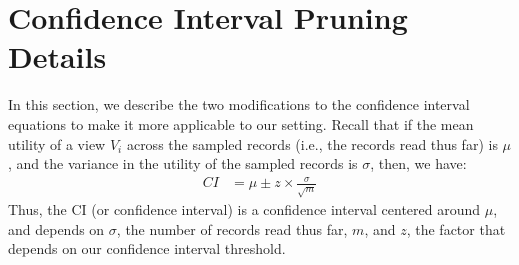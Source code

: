 
\section{Confidence Interval Pruning Details}
In this section, we describe the two modifications to 
the confidence interval equations to make it more applicable to our setting.
Recall that if the mean utility of a view $V_i$ across the sampled records 
(i.e., the records read thus far) is $\mu$,
and the variance in the utility of the sampled records
is $\sigma$, then, we have:
\begin{align}
CI & = \mu \pm z \times \frac{\sigma}{\sqrt{m}}
\end{align}
Thus, the CI (or confidence interval) is 
a confidence interval centered around $\mu$, 
and depends on $\sigma$, the number of records
read thus far, $m$,
and $z$, the factor that depends on our confidence interval threshold.


